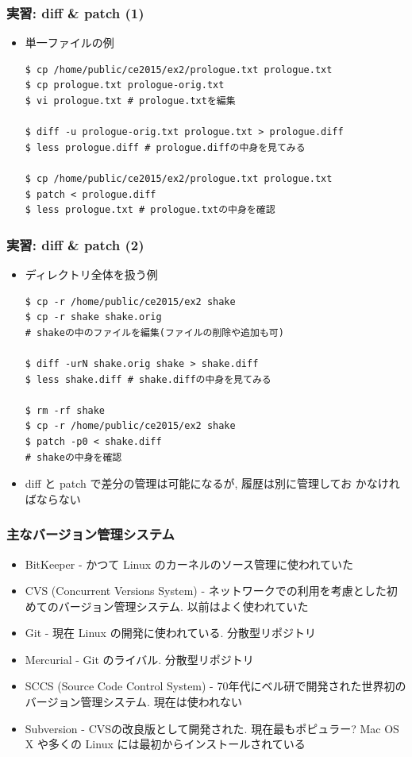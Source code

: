 \documentclass[dvipdfmx]{beamer}
\begin{document}
\begin{frame}[t,fragile]
  \frametitle{実習: diff \& patch (1)}
  \begin{itemize}
  \item 単一ファイルの例
\begin{lstlisting}
$ cp /home/public/ce2015/ex2/prologue.txt prologue.txt
$ cp prologue.txt prologue-orig.txt
$ vi prologue.txt # prologue.txtを編集

$ diff -u prologue-orig.txt prologue.txt > prologue.diff
$ less prologue.diff # prologue.diffの中身を見てみる

$ cp /home/public/ce2015/ex2/prologue.txt prologue.txt
$ patch < prologue.diff
$ less prologue.txt # prologue.txtの中身を確認
\end{lstlisting}
  \end{itemize}
\end{frame}

\begin{frame}[t,fragile]
  \frametitle{実習: diff \& patch (2)}
  \begin{itemize}
  \item ディレクトリ全体を扱う例
\begin{lstlisting}
$ cp -r /home/public/ce2015/ex2 shake
$ cp -r shake shake.orig
# shakeの中のファイルを編集(ファイルの削除や追加も可)

$ diff -urN shake.orig shake > shake.diff
$ less shake.diff # shake.diffの中身を見てみる

$ rm -rf shake
$ cp -r /home/public/ce2015/ex2 shake
$ patch -p0 < shake.diff
# shakeの中身を確認
\end{lstlisting}
  \item diff と patch で差分の管理は可能になるが, 履歴は別に管理してお
    かなければならない
  \end{itemize}
\end{frame}

\begin{frame}
  \frametitle{主なバージョン管理システム}
  \begin{itemize}
  \item BitKeeper - かつて Linux のカーネルのソース管理に使われていた
  \item CVS (Concurrent Versions System) - ネットワークでの利用を考慮とした初めてのバージョン管理システム. 以前はよく使われていた
  \item Git - 現在 Linux の開発に使われている. 分散型リポジトリ
  \item Mercurial - Git のライバル. 分散型リポジトリ
  \item SCCS (Source Code Control System) - 70年代にベル研で開発された世界初のバージョン管理システム. 現在は使われない
  \item {\color{red}Subversion} - CVSの改良版として開発された. 現在最もポピュラー? Mac OS X や多くの Linux には最初からインストールされている
  \end{itemize}
\end{frame}
\end{document}
